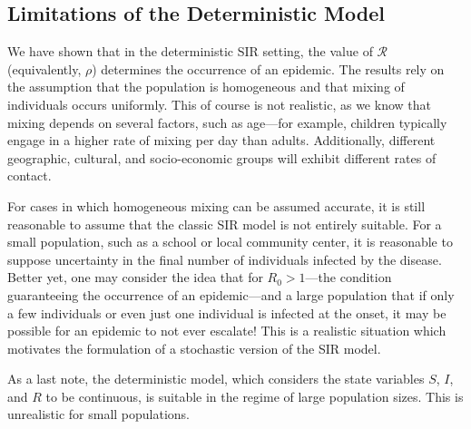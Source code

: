 \documentclass[reqno,11pt]{amsart}
\begin{document}
\subsection{Limitations of the Deterministic Model}
We have shown that in the deterministic SIR setting, the value of $\mathcal R$ (equivalently, $ \rho$) determines the occurrence of an epidemic. The results rely on the assumption that the population is homogeneous and that mixing of individuals occurs uniformly. This of course is not realistic, as we know that mixing depends on several factors, such as age---for example, children typically engage in a higher rate of mixing per day than adults. Additionally, different geographic, cultural, and socio-economic groups will exhibit different rates of contact. 

For cases in which homogeneous mixing can be assumed accurate, it is still reasonable to assume that the classic SIR model is not entirely suitable. For a small population, such as a school or local community center, it is reasonable to suppose uncertainty in the final number of individuals infected by the disease. Better yet, one may consider the idea that for $R_0 > 1$---the condition guaranteeing the occurrence of an epidemic---and a large population that if only a few individuals or even just one individual is infected at the onset, it may be possible for an epidemic to not ever escalate! This is a realistic situation which motivates the formulation of a stochastic version of the SIR model.

As a last note, the deterministic model, which considers the state variables $S$, $I$, and $R$ to be continuous, is suitable in the regime of large population sizes. This is unrealistic for small populations.
%
%
%
%
%
%
\end{document}
